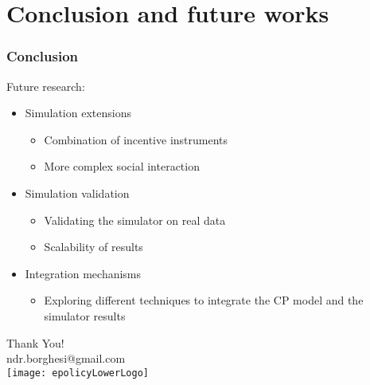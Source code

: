 \documentclass{beamer}
\begin{document}
\section{Conclusion and future works}
	\begin{frame}
	\frametitle{Conclusion}
	Future research:
	\begin{itemize}
		\item Simulation extensions
		\begin{itemize}
			\item Combination of incentive instruments
			\item More complex social interaction
		\end{itemize}
		\item Simulation validation
		\begin{itemize}
			\item Validating the simulator on real data
			\item Scalability of results
		\end{itemize}
		\item Integration mechanisms
		\begin{itemize}
			\item Exploring different techniques to integrate the CP model and the simulator results
		\end{itemize}
	\end{itemize}
	\end{frame}
	
	\begin{frame}
      \begin{center}
        Thank You!\\
        ndr.borghesi@gmail.com\\
        \bigskip \bigskip \bigskip \bigskip 
        \texttt{[image: epolicyLowerLogo]}
      \end{center}
       
    \end{frame}
\end{document}
